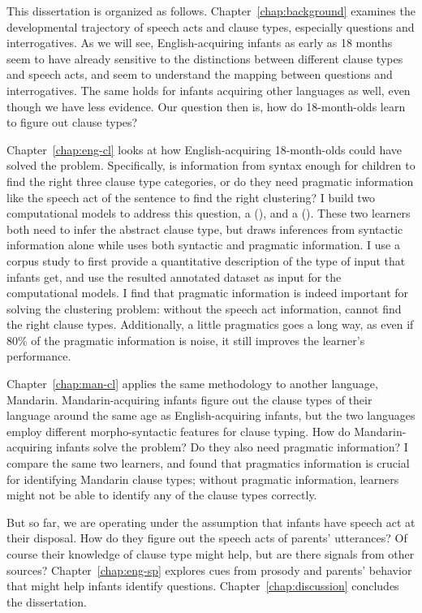 This dissertation is organized as follows. Chapter~\ref{chap:background} examines the developmental trajectory of speech acts and clause types, especially questions and interrogatives. As we will see, English-acquiring infants as early as 18 months seem to have already sensitive to the distinctions between different clause types and speech acts, and seem to understand the mapping between questions and interrogatives. The same holds for infants acquiring other languages as well, even though we have less evidence. Our question then is, how do 18-month-olds learn to figure out clause types?

Chapter~\ref{chap:eng-cl} looks at how English-acquiring 18-month-olds could have solved the problem. Specifically, is information from syntax enough for children to find the right three clause type categories, or do they need pragmatic information like the speech act of the sentence to find the right clustering? I build two computational models to address this question, a \distlearner{} (\dlearnerabbr{}), and a \praglearner{} (\plearnerabbr{}). These two learners both need to infer the abstract clause type, but \dlearnerabbr{} draws inferences from syntactic information alone while \plearnerabbr{} uses both syntactic and pragmatic information. I use a corpus study to first provide a quantitative description of the type of input that infants get, and use the resulted annotated dataset as input for the computational models. I find that pragmatic information is indeed important for solving the clustering problem: without the speech act information, \dlearnerabbr{} cannot find the right clause types. Additionally, a little pragmatics goes a long way, as  even if 80\% of the pragmatic information is noise, it still improves the learner's performance. 

Chapter~\ref{chap:man-cl} applies the same methodology to another language, Mandarin. Mandarin-acquiring infants figure out the clause types of their language around the same age as English-acquiring infants, but the two languages employ different morpho-syntactic features for clause typing. How do Mandarin-acquiring infants solve the problem? Do they also need pragmatic information? I compare the same two learners, and found that pragmatics information is crucial for identifying Mandarin clause types; without pragmatic information, learners might not be able to identify any of the clause types correctly.

But so far, we are operating under the assumption that infants have speech act at their disposal. How do they figure out the speech acts of parents' utterances? Of course their knowledge of clause type might help, but are there signals from other sources? Chapter~\ref{chap:eng-sp} explores cues from prosody and parents' behavior that might help infants identify questions. Chapter~\ref{chap:discussion} concludes the dissertation.


